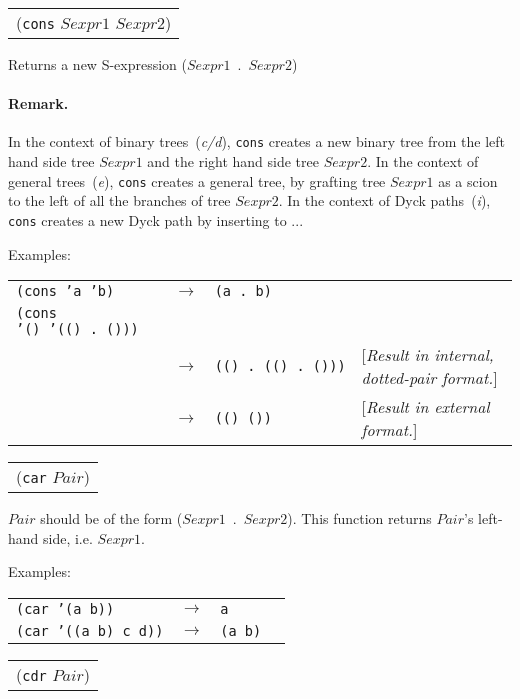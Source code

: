 \documentclass[11pt]{article} %
\newcommand{\catint}[1]{({\it #1})}
\newcommand{\scmsym}[1]{{\tt{#1}}}
\newcommand{\scmetavar}[1]{\ensuremath{\mathit{#1}}}
\newcommand{\scmcode}[1]{{\tt{#1}}}
\newenvironment{scmsimplefun}{\item[] \begin{tabular}{l}}{\\
\end{tabular}}
\newenvironment{scmexample}{Examples:\\
\begin{tabular}{l l l p{5cm}}}{\end{tabular}}
\newcommand{\scmexmcomment}[1]{[\emph{#1}]}
\newcommand{\ra}{\ensuremath{\rightarrow}\xspace}
\begin{document}
\begin{description}

\begin{scmsimplefun}
(\scmsym{cons} \scmetavar{Sexpr1} \scmetavar{Sexpr2})
\end{scmsimplefun}

Returns a new S-expression (\scmetavar{Sexpr1}~.~\scmetavar{Sexpr2})
\paragraph{Remark.}
In the context of binary trees~\catint{c/d}, \scmsym{cons} creates
a new binary tree from the left hand side tree \scmetavar{Sexpr1} and
the right hand side tree  \scmetavar{Sexpr2}.
In the context of general trees~\catint{e}, \scmsym{cons} creates
a general tree, by grafting tree \scmetavar{Sexpr1} as a scion
to the left of all the branches of tree \scmetavar{Sexpr2}.
In the context of Dyck paths~\catint{i}, \scmsym{cons} creates
a new Dyck path by inserting to ...


\begin{scmexample}

\scmcode{(cons 'a 'b)} & \ra & \scmcode{(a . b)}\\

\scmcode{(cons '()~'(()~.~()))}\\
 & \ra & \scmcode{(()~.~(()~.~()))} & \scmexmcomment{Result in internal, dotted-pair format.}\\
 & \ra & \scmcode{(()~())}          & \scmexmcomment{Result in external format.}\\
\end{scmexample}

\begin{scmsimplefun}
(\scmsym{car} \scmetavar{Pair})
\end{scmsimplefun}

\scmetavar{Pair} should be of the form (\scmetavar{Sexpr1}~.~\scmetavar{Sexpr2}).
This function returns \scmetavar{Pair}'s left-hand side,
i.e. \scmetavar{Sexpr1}.

\begin{scmexample}

\scmcode{(car '(a b))} & \ra & \scmcode{a}\\

\scmcode{(car '((a b) c d))} & \ra & \scmcode{(a~b)}\\
\end{scmexample}

\begin{scmsimplefun}
(\scmsym{cdr} \scmetavar{Pair})
\end{scmsimplefun}


\end{description}
\end{document}

